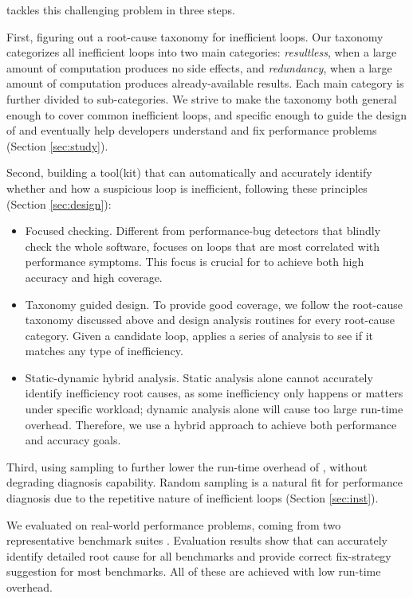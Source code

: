 \Tool tackles this challenging problem in three steps.

First, figuring out a root-cause taxonomy for inefficient loops.
Our taxonomy categorizes all inefficient loops into two main categories:
\emph{resultless}, when a large amount of computation produces
no side effects, and \emph{redundancy}, when a large amount of 
computation produces already-available results.
Each main category is further divided to sub-categories.
We strive to make the taxonomy both general enough to cover
common inefficient loops, and specific enough to guide the design
of \Tool and eventually help developers understand
and fix performance problems
(Section \ref{sec:study}).
 
Second, building a tool(kit) \Tool that can automatically and accurately
identify whether and how a suspicious loop is inefficient, 
following these principles (Section \ref{sec:design}):

\begin{itemize}
\item Focused checking. 
Different from performance-bug detectors that blindly check the whole
software, \Tool focuses on loops that are
most correlated with performance symptoms. 
This focus is crucial for \Tool to achieve both high
accuracy and high coverage.

\item Taxonomy guided design. To provide good coverage, we follow
the root-cause taxonomy discussed above and design analysis routines for
every root-cause category. Given a candidate loop, \Tool
applies a series of analysis to see if it matches any type of inefficiency.

\item Static-dynamic hybrid analysis.
Static analysis alone cannot accurately identify 
inefficiency root causes, as some inefficiency only
happens or matters under specific workload; dynamic analysis alone will 
cause too large 
run-time overhead. Therefore, we use a hybrid approach to achieve both
performance and accuracy goals.
\end{itemize}

Third, using sampling to further lower the run-time overhead of \Tool, without
degrading diagnosis capability. Random sampling is a natural fit for performance
diagnosis due to the repetitive nature of inefficient loops (Section \ref{sec:inst}).

We evaluated \Tool on \allbugs real-world performance problems,
coming from two representative benchmark suites 
\cite{SongOOPSLA2014,Alabama}. 
Evaluation results show that \Tool can accurately identify detailed
root cause for all benchmarks and provide correct fix-strategy suggestion for
most benchmarks. All of these are achieved with low run-time overhead.
